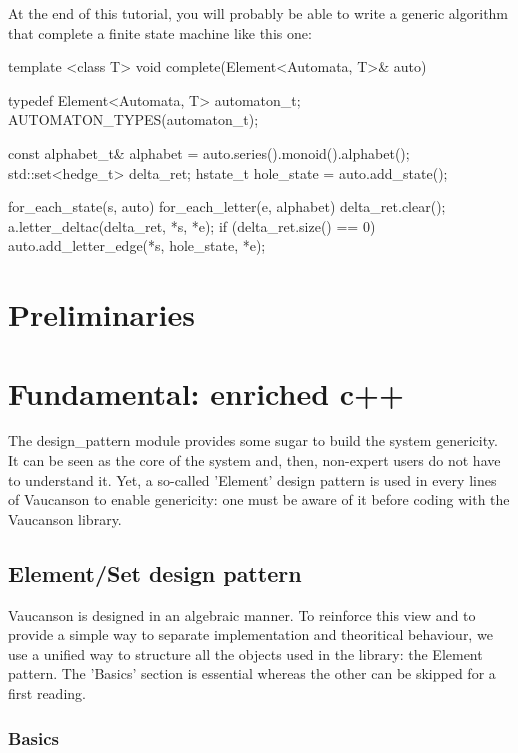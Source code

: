 \documentclass{article}
\begin{document}
At the end of this tutorial, you will probably be able to write a generic
algorithm that complete a finite state machine like this one:

\begin{code}
template <class T>
void complete(Element<Automata, T>& auto)
{
  typedef Element<Automata, T> automaton_t;
  AUTOMATON_TYPES(automaton_t);

  const alphabet_t& alphabet = auto.series().monoid().alphabet();
  std::set<hedge_t> delta_ret;
  hstate_t          hole_state = auto.add_state();

  for_each_state(s, auto)
    for_each_letter(e, alphabet)
    {
      delta_ret.clear();
      a.letter_deltac(delta_ret, *s, *e);
      if (delta_ret.size() == 0)
        auto.add_letter_edge(*s, hole_state, *e);
    }
}
\end{code}

\section{Preliminaries}


\section{Fundamental: enriched c++}

The design_pattern module provides some sugar to build the system
genericity. It can be seen as the core of the system and, then,
non-expert users do not have to understand it. Yet, a so-called
'Element' design pattern is used in every lines of Vaucanson to enable
genericity: one must be aware of it before coding with the Vaucanson
library.

\subsection{Element/Set design pattern}

Vaucanson is designed in an algebraic
manner. To reinforce this view and to provide a simple way to separate
implementation and theoritical behaviour, we use a unified way to
structure all the objects used in the library: the Element pattern. The
'Basics' section is essential whereas the other can be skipped for a
first reading.

\subsubsection{Basics}
\end{document}
